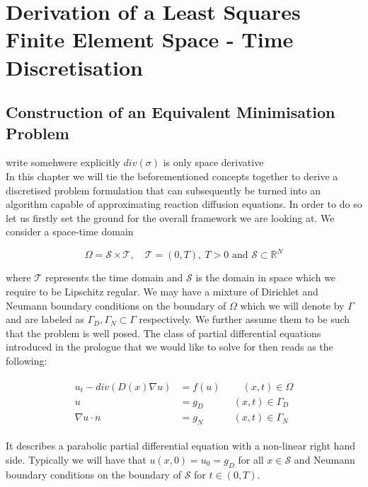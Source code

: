 \documentclass[../draft_1.tex]{subfiles}
\begin{document}
\chapter{Derivation of a Least Squares Finite Element Space - Time Discretisation}
\section{Construction of an Equivalent Minimisation Problem}

write somehwere explicitly $div(\sigma) $ is only space derivative \\
In this chapter we will tie the beforementioned concepts together to derive a discretised problem formulation that can subsequently be turned into an algorithm capable of approximating reaction diffusion equations. In order to do so let us firstly set the ground for the overall framework we are looking at. We consider a space-time domain 
\begin{ceqn}
\begin{equation}
\Omega = \mathcal{S} \times \mathcal{T}, \quad \mathcal{T} = (0,T), \ T>0 \text{ and }  \mathcal{S} \subset \mathbb{R}^N
\end{equation} 
\end{ceqn}
where $\mathcal{T} $ represents the time domain and $ \mathcal{S}$ is the domain in space which we require to be Lipschitz regular. We may have a mixture of Dirichlet and Neumann boundary conditions on the boundary of $\Omega$ which we will denote by $\Gamma$ and are labeled as $\Gamma_D, \Gamma_N \subset \Gamma$ respectively. We further assume them to be such that the problem is well posed. The class of partial differential equations introduced in the prologue that we would like to solve for then reads as the following:
\begin{ceqn}
\begin{align}
\begin{aligned}
u_t - div (D(x) \nabla u) &= f(u) \qquad \  (x,t) \in \Omega \\
u &= g_D \quad \qquad (x,t)  \in \Gamma_D \\
\nabla u \cdot n &= g_N \quad \qquad (x,t) \in \Gamma_N
\end{aligned}
\end{align}
\end{ceqn}
It describes a parabolic partial differential equation with a non-linear right hand side. Typically we will have that $u(x,0) = u_0 = g_D$ for all $ x \in \mathcal{S}$ and Neumann boundary conditions on the boundary of $\mathcal{S}$ for $t \in (0,T)$. 
\end{document}
